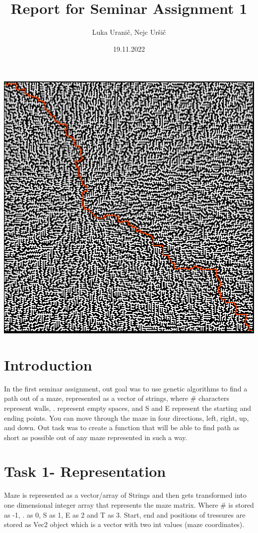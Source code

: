 \documentclass[12pt]{article} %
\title{Report for Seminar Assignment 1}
\author{Luka Uranič, Nejc Uršič}
\date{19.11.2022} %
\begin{document}
\maketitle
\begin{center}
\includegraphics[scale=.75]{bigMaze}
\end{center}

\section{Introduction}
In the first seminar assignment, out goal was to use genetic algorithms to find a path out of a maze,
represented as a vector of strings, where \# characters represent walls, . represent empty spaces, and
S and E represent the starting and ending points.
You can move through the maze in four directions, left, right, up, and down. Out task was to create a function that will be able to find path
 as short as possible out of any maze represented in such a way.

\section{Task 1-  Representation}
Maze is represented as a vector/array of Strings and then gets transformed into one dimensional integer array that represents the maze matrix. Where
\# is stored as -1, . as 0, S as 1, E as 2 and T as 3. Start, end and positions of tressures are stored as Vec2 object which is a vector with two int values (maze coordinates).
\end{document}
